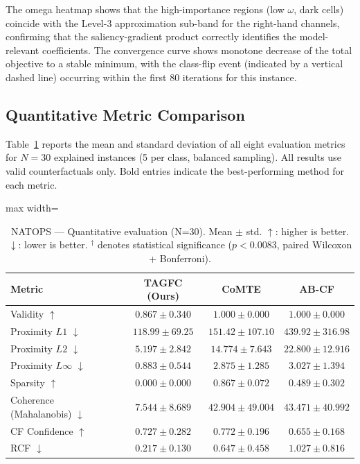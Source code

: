 The omega heatmap shows that the high-importance regions (low $\omega$, dark cells) coincide with the Level-3 approximation sub-band for the right-hand channels, confirming that the saliency-gradient product correctly identifies the model-relevant coefficients. The convergence curve shows monotone decrease of the total objective to a stable minimum, with the class-flip event (indicated by a vertical dashed line) occurring within the first 80 iterations for this instance.

\subsection{Quantitative Metric Comparison}

Table~\ref{tab:natops_results} reports the mean and standard deviation of all eight evaluation metrics for $N = 30$ explained instances (5 per class, balanced sampling). All results use valid counterfactuals only. Bold entries indicate the best-performing method for each metric.

\begin{table}[htbp]
\centering
\caption{NATOPS — Quantitative evaluation (N=30). Mean $\pm$ std. $\uparrow$: higher is better. $\downarrow$: lower is better. $^\dagger$ denotes statistical significance ($p < 0.0083$, paired Wilcoxon + Bonferroni).}
\label{tab:natops_results}
\begin{adjustbox}{max width=\textwidth}
\begin{tabular}{lccc}
\toprule
\textbf{Metric} & \textbf{TAGFC (Ours)} & \textbf{CoMTE} & \textbf{AB-CF} \\
\midrule
Validity $\uparrow$                        & $0.867 \pm 0.340$              & $\mathbf{1.000 \pm 0.000}$ & $\mathbf{1.000 \pm 0.000}$ \\
Proximity $L1$ $\downarrow$                & $\mathbf{118.99 \pm 69.25}$    & $151.42 \pm 107.10$        & $439.92 \pm 316.98$        \\
Proximity $L2$ $\downarrow$                & $\mathbf{5.197 \pm 2.842}$     & $14.774 \pm 7.643$         & $22.800 \pm 12.916$        \\
Proximity $L\infty$ $\downarrow$           & $\mathbf{0.883 \pm 0.544}$     & $2.875 \pm 1.285$          & $3.027 \pm 1.394$          \\
Sparsity $\uparrow$                        & $0.000 \pm 0.000$              & $\mathbf{0.867 \pm 0.072}$ & $0.489 \pm 0.302$          \\
Coherence (Mahalanobis) $\downarrow$       & $\mathbf{7.544 \pm 8.689}$     & $42.904 \pm 49.004$        & $43.471 \pm 40.992$        \\
CF Confidence $\uparrow$                   & $0.727 \pm 0.282$              & $\mathbf{0.772 \pm 0.196}$ & $0.655 \pm 0.168$          \\
RCF $\downarrow$                           & $\mathbf{0.217 \pm 0.130}$     & $0.647 \pm 0.458$          & $1.027 \pm 0.816$          \\
\bottomrule
\end{tabular}
\end{adjustbox}
\end{table}

